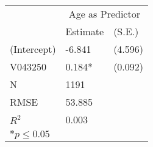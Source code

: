 \begin{tabular}{*{3}{l}}
 \hline
                &\multicolumn{2}{c}{Age as Predictor}   \\
                &Estimate &(S.E.) \\
 \hline
 \hline
  (Intercept)    & -6.841  &   (4.596) \\
  V043250        &  0.184*  &   (0.092) \\
 \hline 
 N                &1191      &       \\
 RMSE            &53.885        & \\
 $R^2$           &0.003        & \\
 \hline
 \hline
 
 \multicolumn{2}{l}{${*}  p \le 0.05$   }\\
 \end{tabular}